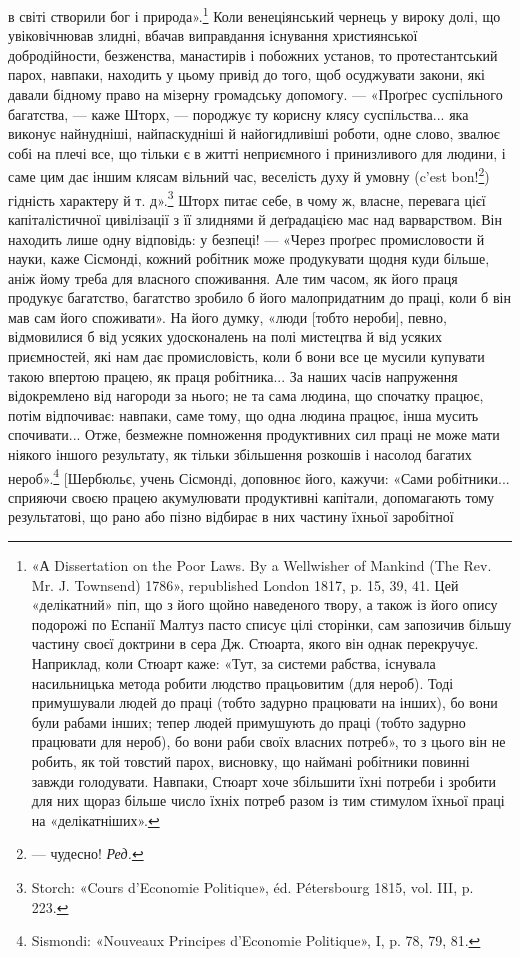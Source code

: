 \parcont{}  %
в світі створили бог і природа».\footnote{
«А Dissertation on the Poor Laws. By a Wellwisher of Mankind
(The Rev. Mr. J. Townsend) 1786», republished London 1817, p. 15, 39,
41. Цей «делікатний» піп, що з його щойно наведеного твору, а також із
його опису подорожі по Еспанії Малтуз пасто списує цілі сторінки, сам
запозичив більшу частину своєї доктрини в сера Дж. Стюарта, якого він
однак перекручує. Наприклад, коли Стюарт каже: «Тут, за системи рабства,
існувала насильницька метода робити людство працьовитим (для
нероб). Тоді примушували людей до праці (тобто задурно працювати на
інших), бо вони були рабами інших; тепер людей примушують до праці
(тобто задурно працювати для нероб), бо вони раби своїх власних потреб»,
то з цього він не робить, як той товстий парох, висновку, що наймані
робітники повинні завжди голодувати. Навпаки, Стюарт хоче збільшити
їхні потреби і зробити для них щораз більше число їхніх потреб разом
із тим стимулом їхньої праці на «делікатніших».
} Коли венеціянський чернець
у вироку долі, що увіковічнював злидні, вбачав виправдання
існування християнської добродійности, безженства, манастирів
і побожних установ, то протестантський парох, навпаки, находить
у цьому привід до того, щоб осуджувати закони, які давали бідному
право на мізерну громадську допомогу. — «Проґрес суспільного
багатства, — каже Шторх, — породжує ту корисну клясу суспільства...
яка виконує найнудніші, найпаскудніші й найогидливіші
роботи, одне слово, звалює собі на плечі все, що тільки є в житті
неприємного і принизливого для людини, і саме цим дає іншим
клясам вільний час, веселість духу й умовну (c’est bon!\footnote*{
— чудесно! \emph{Ред.}
}) гідність
характеру й т. д».\footnote{
Storch: «Cours d’Economie Politique», éd. Pétersbourg 1815, vol. III,
p. 223.
} Шторх питає себе, в чому ж, власне,
перевага цієї капіталістичної цивілізації з її злиднями й деґрадацією
мас над варварством. Він находить лише одну відповідь:
у безпеці! — «Через проґрес промисловости й науки, каже Сісмонді,
кожний робітник може продукувати щодня куди більше,
аніж йому треба для власного споживання. Але тим часом, як
його праця продукує багатство, багатство зробило б його малопридатним
до праці, коли б він мав сам його споживати». На його
думку, «люди [тобто нероби], певно, відмовилися б від усяких
удосконалень на полі мистецтва й від усяких приємностей, які
нам дає промисловість, коли б вони все це мусили купувати
такою впертою працею, як праця робітника... За наших часів
напруження відокремлено від нагороди за нього; не та сама людина,
що спочатку працює, потім відпочиває: навпаки, саме
тому, що одна людина працює, інша мусить спочивати... Отже,
безмежне помноження продуктивних сил праці не може мати
ніякого іншого результату, як тільки збільшення розкошів і
насолод багатих нероб».\footnote{
Sismondi: «Nouveaux Principes d’Economie Politique», I, p. 78,
79, 81.
} [Шербюльє, учень Сісмонді, доповнює
його, кажучи: «Сами робітники... сприяючи своєю працею акумулювати
продуктивні капітали, допомагають тому результатові,
що рано або пізно відбирає в них частину їхньої заробітної
\parbreak{}  %
